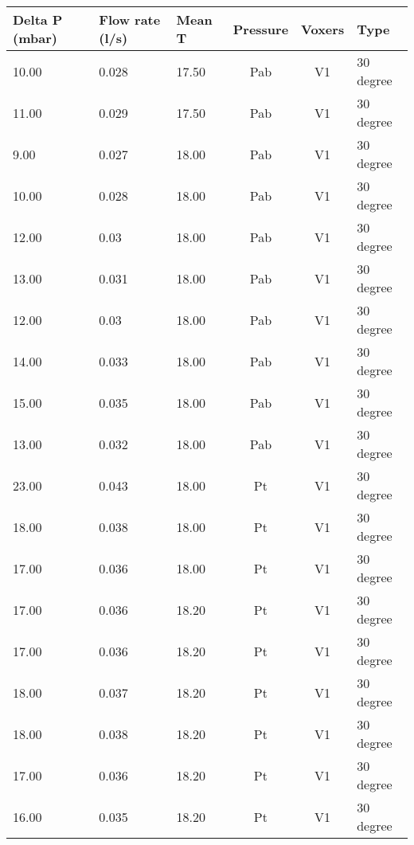 \begin{table}[t]
\centering
\begin{tabular}{l | l | l | c | c | l}
Delta P (mbar) & Flow rate (l/s) & Mean T & Pressure & Voxers & Type                \\ \hline
10.00          & 0.028           & 17.50  & Pab      & V1     & 30 degree           \\
11.00          & 0.029           & 17.50  & Pab      & V1     & 30 degree           \\
9.00           & 0.027           & 18.00  & Pab      & V1     & 30 degree           \\
10.00          & 0.028           & 18.00  & Pab      & V1     & 30 degree           \\
12.00          & 0.03            & 18.00  & Pab      & V1     & 30 degree           \\
13.00          & 0.031           & 18.00  & Pab      & V1     & 30 degree           \\
12.00          & 0.03            & 18.00  & Pab      & V1     & 30 degree           \\
14.00          & 0.033           & 18.00  & Pab      & V1     & 30 degree           \\
15.00          & 0.035           & 18.00  & Pab      & V1     & 30 degree           \\
13.00          & 0.032           & 18.00  & Pab      & V1     & 30 degree           \\
23.00          & 0.043           & 18.00  & Pt       & V1     & 30 degree           \\
18.00          & 0.038           & 18.00  & Pt       & V1     & 30 degree           \\
17.00          & 0.036           & 18.00  & Pt       & V1     & 30 degree           \\
17.00          & 0.036           & 18.20  & Pt       & V1     & 30 degree           \\
17.00          & 0.036           & 18.20  & Pt       & V1     & 30 degree           \\
18.00          & 0.037           & 18.20  & Pt       & V1     & 30 degree           \\
18.00          & 0.038           & 18.20  & Pt       & V1     & 30 degree           \\
17.00          & 0.036           & 18.20  & Pt       & V1     & 30 degree           \\
16.00          & 0.035           & 18.20  & Pt       & V1     & 30 degree           \\

\end{tabular}
\end{table}

